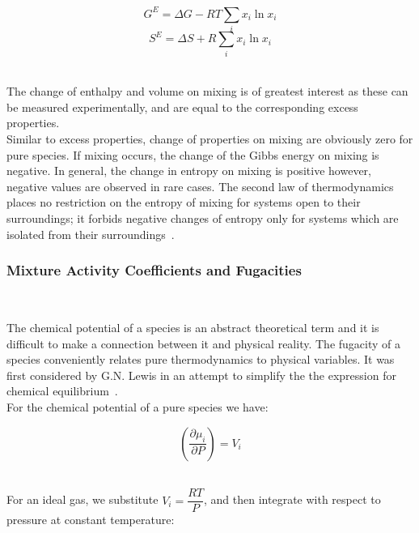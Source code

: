 \begin{equation}
G^{E}  = \Delta G - RT\sum_{i}x_{i}\ln x_{i} 
\end{equation}
\begin{equation}
S^{E}  = \Delta S  + R\sum_{i}x_{i}\ln x_{i}
\end{equation}\

The change of enthalpy and volume on mixing is of greatest interest as these can be measured experimentally, and are equal to the corresponding excess properties.\\

Similar to excess properties, change of properties on mixing are obviously zero for pure species. If mixing occurs, the change of the Gibbs energy on mixing is negative. In general, the change in entropy on mixing is positive however, negative values are observed in rare cases. The second law of thermodynamics places no restriction on the entropy of mixing for systems open to their surroundings; it forbids negative changes of entropy only for systems which are isolated from their surroundings~\cite{SmithNessAbbott}.\


\subsubsection{Mixture Activity Coefficients and Fugacities}\

The chemical potential of a species is an abstract theoretical term and it is difficult to make a connection between it and physical reality. The fugacity of a species conveniently relates pure thermodynamics to physical variables. It was first considered by G.N. Lewis in an attempt to simplify the the expression for chemical equilibrium~\cite{MolecularThermodynamicsOfFluidPhaseEquilibria}.\\

For the chemical potential of a pure species we have:\

\begin{equation}
\left(\frac{\partial\mu_{i}}{\partial P}\right) = V_{i}
\end{equation}\
 
For an ideal gas, we substitute $V_{i} = \dfrac{RT}{P}$, and then integrate with respect to pressure at constant temperature:\

